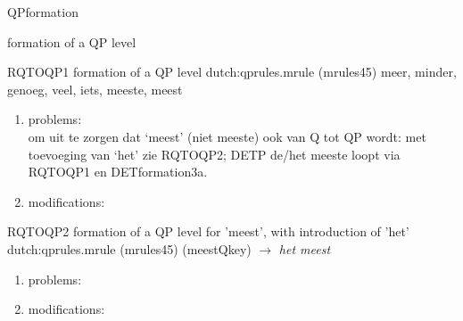 \begin{mruleclass}{QPformation}
\begin{classdescr}
\kind \nokind
\classtask formation of a QP level
\classremarks

\nofilters

\nospeedrules

\noplannedrules

\norulesnotince


\end{classdescr}

\begin{members}
\begin{member}
 RQTOQP1 
 formation of a QP level
\file dutch:qprules.mrule (mrules45)
\semantics \nosemantics
\example meer, minder, genoeg, veel, iets, meeste, meest
\remarks\mbox{}
\begin{enumerate}
\item problems:\\
om uit te zorgen dat `meest' (niet meeste) ook van Q tot QP wordt:
met toevoeging van `het'
zie RQTOQP2; DETP de/het meeste loopt via
RQTOQP1 en DETformation3a.
\item modifications:\\

\end{enumerate}

\end{member}
\begin{member}
  RQTOQP2
 formation of a QP level for 'meest', with introduction of 'het'
\file dutch:qprules.mrule (mrules45)
\semantics \nosemantics
{} (meestQkey) $\rightarrow$ {\em het meest}
\remarks\mbox{}
\begin{enumerate}
\item problems:\\

\item modifications:\\

\end{enumerate}


\end{member}
\end{members}
\end{mruleclass}
